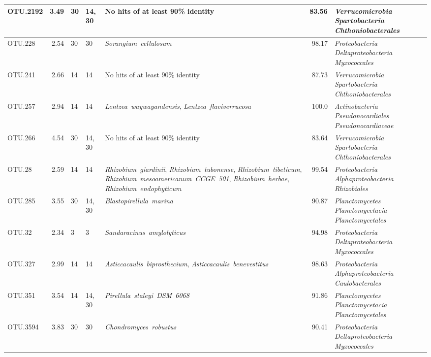 \begin{ThreePartTable}
\begin{longtable}{P{1.5cm}rP{1cm}P{1.5cm}P{4cm}rP{5cm}}
OTU.2192 & 3.49 & 30 & 14, 30&{No hits of at least 90\% identity} & 83.56 & \mbox{\textit{Verrucomicrobia}} \mbox{\textit{Spartobacteria}} \mbox{\textit{Chthoniobacterales}} \\ \midrule
OTU.228 & 2.54 & 30 & 30&\mbox{\textit{Sorangium cellulosum}} & 98.17 & \mbox{\textit{Proteobacteria}} \mbox{\textit{Deltaproteobacteria}} \mbox{\textit{Myxococcales}} \\ \midrule
OTU.241 & 2.66 & 14 & 14&{No hits of at least 90\% identity} & 87.73 & \mbox{\textit{Verrucomicrobia}} \mbox{\textit{Spartobacteria}} \mbox{\textit{Chthoniobacterales}} \\ \midrule
OTU.257 & 2.94 & 14 & 14&\mbox{\textit{Lentzea waywayandensis}}, \mbox{\textit{Lentzea flaviverrucosa}} & 100.0 & \mbox{\textit{Actinobacteria}} \mbox{\textit{Pseudonocardiales}} \mbox{\textit{Pseudonocardiaceae}} \\ \midrule
OTU.266 & 4.54 & 30 & 14, 30&{No hits of at least 90\% identity} & 83.64 & \mbox{\textit{Verrucomicrobia}} \mbox{\textit{Spartobacteria}} \mbox{\textit{Chthoniobacterales}} \\ \midrule
OTU.28 & 2.59 & 14 & 14&\mbox{\textit{Rhizobium giardinii}}, \mbox{\textit{Rhizobium tubonense}}, \mbox{\textit{Rhizobium tibeticum}}, \mbox{\textit{Rhizobium mesoamericanum CCGE 501}}, \mbox{\textit{Rhizobium herbae}}, \mbox{\textit{Rhizobium endophyticum}} & 99.54 & \mbox{\textit{Proteobacteria}} \mbox{\textit{Alphaproteobacteria}} \mbox{\textit{Rhizobiales}} \\ \midrule
OTU.285 & 3.55 & 30 & 14, 30&\mbox{\textit{Blastopirellula marina}} & 90.87 & \mbox{\textit{Planctomycetes}} \mbox{\textit{Planctomycetacia}} \mbox{\textit{Planctomycetales}} \\ \midrule
OTU.32 & 2.34 & 3 & 3&\mbox{\textit{Sandaracinus amylolyticus}} & 94.98 & \mbox{\textit{Proteobacteria}} \mbox{\textit{Deltaproteobacteria}} \mbox{\textit{Myxococcales}} \\ \midrule
OTU.327 & 2.99 & 14 & 14&\mbox{\textit{Asticcacaulis biprosthecium}}, \mbox{\textit{Asticcacaulis benevestitus}} & 98.63 & \mbox{\textit{Proteobacteria}} \mbox{\textit{Alphaproteobacteria}} \mbox{\textit{Caulobacterales}} \\ \midrule
OTU.351 & 3.54 & 14 & 14, 30&\mbox{\textit{Pirellula staleyi DSM 6068}} & 91.86 & \mbox{\textit{Planctomycetes}} \mbox{\textit{Planctomycetacia}} \mbox{\textit{Planctomycetales}} \\ \midrule
OTU.3594 & 3.83 & 30 & 30&\mbox{\textit{Chondromyces robustus}} & 90.41 & \mbox{\textit{Proteobacteria}} \mbox{\textit{Deltaproteobacteria}} \mbox{\textit{Myxococcales}} \\ \midrule

\end{longtable}
\end{ThreePartTable}
